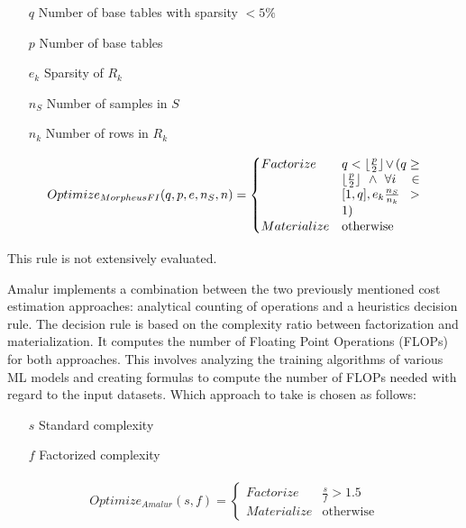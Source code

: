 \begin{definition}
    \begin{itemize}
        \item[]
            \item[$q$]Number of base tables with sparsity $ < 5\% $
        \item[$p$] Number of base tables
        \item[$e_k$] Sparsity of $R_k$
        \item[$n_S$] Number of samples in $S$
        \item[$n_k$] Number of rows in $R_k$
    \end{itemize}

    \begin{align*}
        \begin{split}
            Optimize_{MorpheusFI}(q, p, e, n_S, n) =
            \begin{cases}
                Factorize   & \parbox[t]{.18\linewidth}{$q < \lfloor \frac{p}{2} \rfloor \vee ( q \geq \lfloor \frac{p}{2} \rfloor \wedge \forall i \in [1,q], e_k \frac{n_S}{n_k} > 1)$} \\
                Materialize & \text{otherwise}
            \end{cases}
        \end{split}
    \end{align*}
\end{definition}

This rule is not extensively evaluated.

Amalur \cite{schijndel_cost_estimation} implements a combination between the two previously mentioned cost estimation approaches: analytical counting of operations and a heuristics decision rule. The decision rule is based on the complexity ratio between factorization and materialization. It computes the number of Floating Point Operations (FLOPs) for both approaches. This involves analyzing the training algorithms of various ML models and creating formulas to compute the number of FLOPs needed with regard to the input datasets. Which approach to take is chosen as follows:

\begin{definition}

    \begin{itemize}
        \item[]
        \item[$s$] Standard complexity
        \item[$f$] Factorized complexity
    \end{itemize}

    \begin{align*}
        \begin{split}
            Optimize_{Amalur}(s, f) =
            \begin{cases}
                Factorize   & \frac{s}{f} > 1.5 \\
                Materialize & \text{otherwise}
            \end{cases}
        \end{split}
    \end{align*}
\end{definition}

